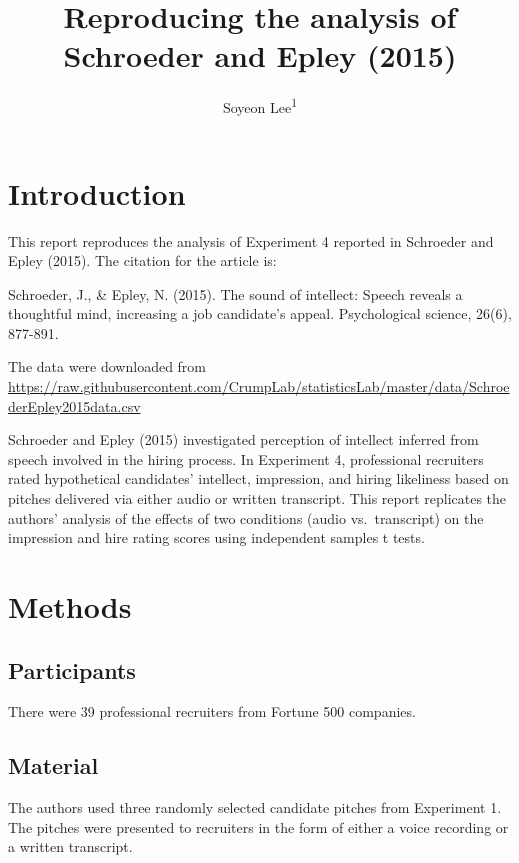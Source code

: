 \documentclass[
  english,
  man]{apa6}
\title{Reproducing the analysis of Schroeder and Epley (2015)}
\author{Soyeon Lee\textsuperscript{1}}
\date{}
\affiliation{\vspace{0.5cm}\textsuperscript{1} Brooklyn College of the City University of New York}
\begin{document}
\maketitle

\hypertarget{introduction}{%
\section{Introduction}\label{introduction}}

This report reproduces the analysis of Experiment 4 reported in Schroeder and Epley (2015). The citation for the article is:

Schroeder, J., \& Epley, N. (2015). The sound of intellect: Speech reveals a thoughtful mind, increasing a job candidate's appeal. Psychological science, 26(6), 877-891.

The data were downloaded from \url{https://raw.githubusercontent.com/CrumpLab/statisticsLab/master/data/SchroederEpley2015data.csv}

Schroeder and Epley (2015) investigated perception of intellect inferred from speech involved in the hiring process. In Experiment 4, professional recruiters rated hypothetical candidates' intellect, impression, and hiring likeliness based on pitches delivered via either audio or written transcript. This report replicates the authors' analysis of the effects of two conditions (audio vs.~transcript) on the impression and hire rating scores using independent samples t tests.

\hypertarget{methods}{%
\section{Methods}\label{methods}}

\hypertarget{participants}{%
\subsection{Participants}\label{participants}}

There were 39 professional recruiters from Fortune 500 companies.

\hypertarget{material}{%
\subsection{Material}\label{material}}

The authors used three randomly selected candidate pitches from Experiment 1. The pitches were presented to recruiters in the form of either a voice recording or a written transcript.
\end{document}

